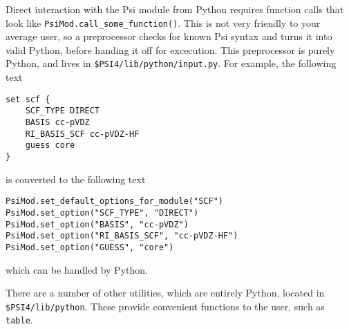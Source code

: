 Direct interaction with the Psi module from Python requires function calls that
look like {\tt PsiMod.call\_some\_function()}.  This is not very friendly to
your average user, so a preprocessor checks for known Psi syntax and turns it
into valid Python, before handing it off for excecution.  This preprocessor is
purely Python, and lives in {\tt \$PSI4/lib/python/input.py}.  For example, the
following text \begin{verbatim}
set scf {
    SCF_TYPE DIRECT
    BASIS cc-pVDZ
    RI_BASIS_SCF cc-pVDZ-HF
    guess core
}
\end{verbatim}
is converted to the following text
\begin{verbatim}
PsiMod.set_default_options_for_module("SCF")
PsiMod.set_option("SCF_TYPE", "DIRECT")
PsiMod.set_option("BASIS", "cc-pVDZ")
PsiMod.set_option("RI_BASIS_SCF", "cc-pVDZ-HF")
PsiMod.set_option("GUESS", "core")
\end{verbatim}
which can be handled by Python.

There are a number of other utilities, which are entirely Python, located in
{\tt \$PSI4/lib/python}.  These provide convenient functions to the user, such
as {\tt table}.

